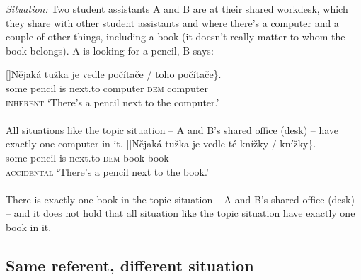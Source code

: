 \documentclass[output=paper,colorlinks,citecolor=brown,newtxmath]{langscibook}
\begin{document}
\eanoraggedright \textit{Situation:} Two student assistants A and B are at their shared workdesk, which they share with other student assistants and where there's a computer and a couple of other things, including a book (it doesn't really matter to whom the book belongs). A is looking for a pencil, B says:\label{simik:ex:comp-book}
\begin{xlist}
[]{\gll Nějaká tužka je vedle \minsp{\{} počítače / \minsp{\#} toho počítače\}.\\
some pencil is next.to {} computer {} {} \textsc{dem} computer\\\hfill\textsc{inherent}
\glt `There's a pencil next to the computer.'\smallskip\\
\smallskip\\
All situations like the topic situation -- A and B's shared office (desk) -- have exactly one computer in it.}
[]{\gll Nějaká tužka je vedle \minsp{\{} té knížky / \minsp{\#} knížky\}.\\
some pencil is next.to {} \textsc{dem} book {} {} book\\\hfill\textsc{accidental}
\glt `There's a pencil next to the book.'\smallskip\\
\smallskip\\
There is exactly one book in the topic situation -- A and B's shared office (desk) -- and it does not hold that all situation like the topic situation have exactly one book in it.}
\end{xlist}
\z

\subsection{Same referent, different situation}\label{simik:sec:diff-ref}
\end{document}

